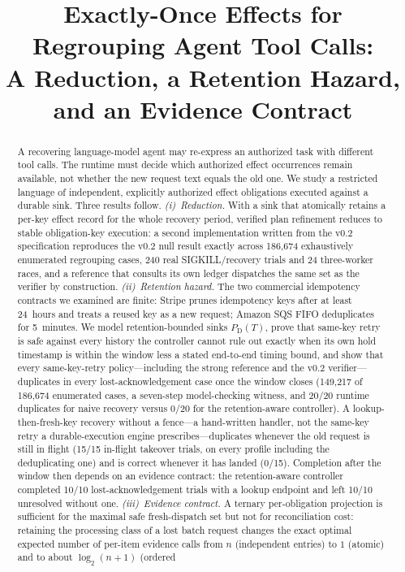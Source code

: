 \documentclass[conference,10pt]{IEEEtran}
\newcommand{\PDT}{P_{\mathrm{D}}(T)}
\begin{document}
\title{Exactly-Once Effects for Regrouping Agent Tool Calls:\\
A Reduction, a Retention Hazard, and an Evidence Contract}

\author{
}

\maketitle

\begin{abstract}
A recovering language-model agent may re-express an authorized task with different tool calls. The runtime must decide which authorized effect occurrences remain available, not whether the new request text equals the old one. We study a restricted language of independent, explicitly authorized effect obligations executed against a durable sink. Three results follow. \emph{(i)~Reduction.} With a sink that atomically retains a per-key effect record for the whole recovery period, verified plan refinement reduces to stable obligation-key execution: a second implementation written from the v0.2 specification reproduces the v0.2 null result exactly across 186{,}674 exhaustively enumerated regrouping cases, 240 real SIGKILL/recovery trials and 24 three-worker races, and a reference that consults its own ledger dispatches the same set as the verifier by construction. \emph{(ii)~Retention hazard.} The two commercial idempotency contracts we examined are finite: Stripe prunes idempotency keys after at least 24~hours and treats a reused key as a new request; Amazon SQS FIFO deduplicates for 5~minutes. We model retention-bounded sinks $\PDT$, prove that same-key retry is safe against every history the controller cannot rule out exactly when its own hold timestamp is within the window less a stated end-to-end timing bound, and show that every same-key-retry policy---including the strong reference and the v0.2 verifier---duplicates in every lost-acknowledgement case once the window closes (149{,}217 of 186{,}674 enumerated cases, a seven-step model-checking witness, and 20/20 runtime duplicates for naive recovery versus 0/20 for the retention-aware controller). A lookup-then-fresh-key recovery without a fence---a hand-written handler, not the same-key retry a durable-execution engine prescribes---duplicates whenever the old request is still in flight (15/15 in-flight takeover trials, on every profile including the deduplicating one) and is correct whenever it has landed (0/15). Completion after the window then depends on an evidence contract: the retention-aware controller completed 10/10 lost-acknowledgement trials with a lookup endpoint and left 10/10 unresolved without one. \emph{(iii)~Evidence contract.} A ternary per-obligation projection is sufficient for the maximal safe fresh-dispatch set but not for reconciliation cost: retaining the processing class of a lost batch request changes the exact optimal expected number of per-item evidence calls from $n$ (independent entries) to $1$ (atomic) and to about $\log_2(n{+}1)$ (ordered 
\end{abstract}
\end{document}
